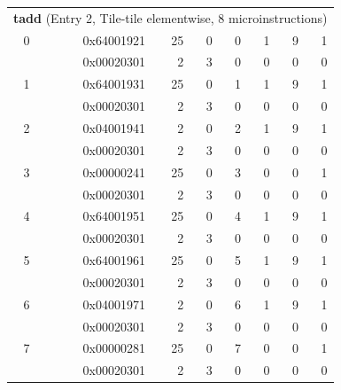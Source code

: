 \begin{longtable}{r r r r r r r r}
\multicolumn{8}{l}{\textbf{tadd} (Entry 2, Tile-tile elementwise, 8 microinstructions)} \\
0 & 0x64001921 & 25 & 0 & 0 & 1 & 9 & 1 \\
  & 0x00020301 & 2 & 3 & 0 & 0 & 0 & 0 \\
1 & 0x64001931 & 25 & 0 & 1 & 1 & 9 & 1 \\
  & 0x00020301 & 2 & 3 & 0 & 0 & 0 & 0 \\
2 & 0x04001941 & 2 & 0 & 2 & 1 & 9 & 1 \\
  & 0x00020301 & 2 & 3 & 0 & 0 & 0 & 0 \\
3 & 0x00000241 & 25 & 0 & 3 & 0 & 0 & 1 \\
  & 0x00020301 & 2 & 3 & 0 & 0 & 0 & 0 \\
4 & 0x64001951 & 25 & 0 & 4 & 1 & 9 & 1 \\
  & 0x00020301 & 2 & 3 & 0 & 0 & 0 & 0 \\
5 & 0x64001961 & 25 & 0 & 5 & 1 & 9 & 1 \\
  & 0x00020301 & 2 & 3 & 0 & 0 & 0 & 0 \\
6 & 0x04001971 & 2 & 0 & 6 & 1 & 9 & 1 \\
  & 0x00020301 & 2 & 3 & 0 & 0 & 0 & 0 \\
7 & 0x00000281 & 25 & 0 & 7 & 0 & 0 & 1 \\
  & 0x00020301 & 2 & 3 & 0 & 0 & 0 & 0 \\


\end{longtable}
